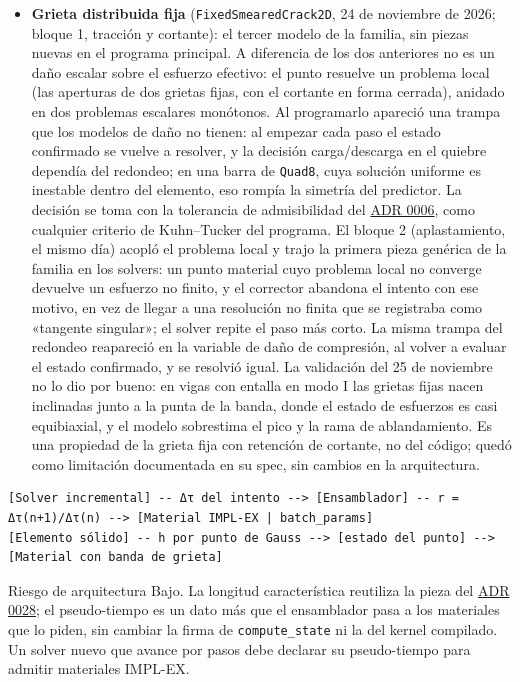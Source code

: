 \documentclass[11pt,oneside]{report}
\begin{document}
\begin{itemize}
  \item \textbf{Grieta distribuida fija} (\texttt{FixedSmearedCrack2D}, 24 de noviembre de 2026; bloque 1, tracción y cortante): el tercer modelo de la familia, sin piezas nuevas en el programa principal. A diferencia de los dos anteriores no es un daño escalar sobre el esfuerzo efectivo: el punto resuelve un problema local (las aperturas de dos grietas fijas, con el cortante en forma cerrada), anidado en dos problemas escalares monótonos. Al programarlo apareció una trampa que los modelos de daño no tienen: al empezar cada paso el estado confirmado se vuelve a resolver, y la decisión carga/descarga en el quiebre dependía del redondeo; en una barra de \texttt{Quad8}, cuya solución uniforme es inestable dentro del elemento, eso rompía la simetría del predictor. La decisión se toma con la tolerancia de admisibilidad del \hyperref[adr:0006]{ADR 0006}, como cualquier criterio de Kuhn--Tucker del programa. El bloque 2 (aplastamiento, el mismo día) acopló el problema local y trajo la primera pieza genérica de la familia en los solvers: un punto material cuyo problema local no converge devuelve un esfuerzo no finito, y el corrector abandona el intento con ese motivo, en vez de llegar a una resolución no finita que se registraba como «tangente singular»; el solver repite el paso más corto. La misma trampa del redondeo reapareció en la variable de daño de compresión, al volver a evaluar el estado confirmado, y se resolvió igual. La validación del 25 de noviembre no lo dio por bueno: en vigas con entalla en modo I las grietas fijas nacen inclinadas junto a la punta de la banda, donde el estado de esfuerzos es casi equibiaxial, y el modelo sobrestima el pico y la rama de ablandamiento. Es una propiedad de la grieta fija con retención de cortante, no del código; quedó como limitación documentada en su spec, sin cambios en la arquitectura.
\end{itemize}
\begin{lstlisting}
[Solver incremental] -- Δτ del intento --> [Ensamblador] -- r = Δτ(n+1)/Δτ(n) --> [Material IMPL-EX | batch_params]
[Elemento sólido] -- h por punto de Gauss --> [estado del punto] --> [Material con banda de grieta]

\end{lstlisting}

\begin{infobox}{Riesgo de arquitectura}
Bajo. La longitud característica reutiliza la pieza del \hyperref[adr:0028]{ADR 0028}; el pseudo-tiempo es un dato más que el ensamblador pasa a los materiales que lo piden, sin cambiar la firma de \texttt{compute\_state} ni la del kernel compilado. Un solver nuevo que avance por pasos debe declarar su pseudo-tiempo para admitir materiales IMPL-EX.
\end{infobox}
\end{document}
